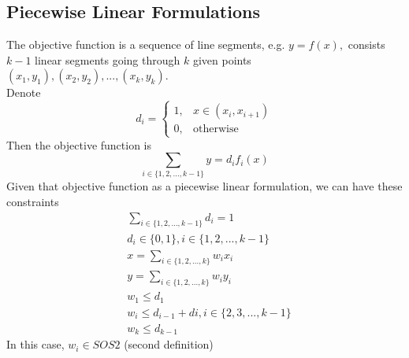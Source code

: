 \documentclass[10pt]{book}
\begin{document}
				\subsection{Piecewise Linear Formulations}
					 The objective function is a sequence of line segments, e.g. $y=f(x), $ consists $k-1$ linear segments going through $k$ given points $(x_1, y_1), (x_2, y_2), ... ,(x_k, y_k)$.\\
					Denote 
					\begin{equation}d_i=\begin{cases}1, & x\in (x_i, x_{i+1})\\0, & \text{otherwise} \end{cases}\nonumber\end{equation}
					Then the objective function is
					\begin{equation}\sum_{i \in \{1, 2, ..., k-1\}} y = d_if_i(x)\nonumber \end{equation} 
					 Given that objective function as a piecewise linear formulation, we can have these constraints\\
					\begin{align}
						&\sum_{i \in \{1, 2, ..., k-1\}} d_i =1 \nonumber \\
						&d_i \in \{0, 1\}, i \in \{1, 2, ..., k-1\} \nonumber \\
						& x = \sum_{i \in \{1, 2, ..., k\}} w_i x_i \nonumber \\
						& y = \sum_{i \in \{1, 2, ..., k\}} w_i y_i \nonumber \\
						& w_1 \le d_1 \nonumber \\
						& w_i \le d_{i-1} + d{i}, i \in \{2, 3, ..., k-1\} \nonumber \\
						& w_k \le d_{k-1} \nonumber
					\end{align}
					In this case, $ w_i \in SOS2$ (second definition)		
										
\end{document}
